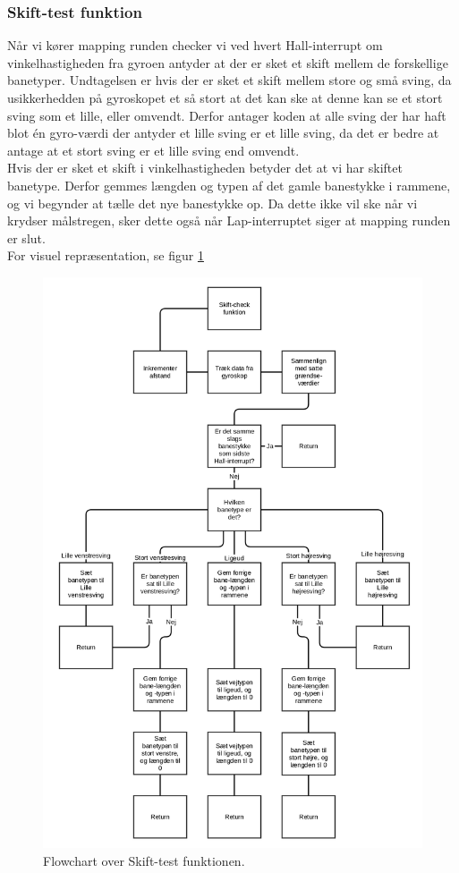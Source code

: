 \subsubsection{Skift-test funktion}

Når vi kører mapping runden checker vi ved hvert Hall-interrupt om vinkelhastigheden fra gyroen antyder at der er sket et skift mellem de forskellige banetyper. Undtagelsen er hvis der er sket et skift mellem store og små sving, da usikkerhedden på gyroskopet et så stort at det kan ske at denne kan se et stort sving som et lille, eller omvendt. Derfor antager koden at alle sving der har haft blot én gyro-værdi der antyder et lille sving er et lille sving, da det er bedre at antage at et stort sving er et lille sving end omvendt. 
\\
Hvis der er sket et skift i vinkelhastigheden betyder det at vi har skiftet banetype. Derfor gemmes længden og typen af det gamle banestykke i rammene, og vi begynder at tælle det nye banestykke op. Da dette ikke vil ske når vi krydser målstregen, sker dette også når Lap-interruptet siger at mapping runden er slut.
\\
For visuel repræsentation, se figur \ref{fig:Skift Flowchart}

\begin{figure}[H]
\centering
\includegraphics[scale=0.12]{Billeder/skift_check.png}
\caption{Flowchart over Skift-test funktionen.}
\label{fig:Skift Flowchart}
\end{figure}